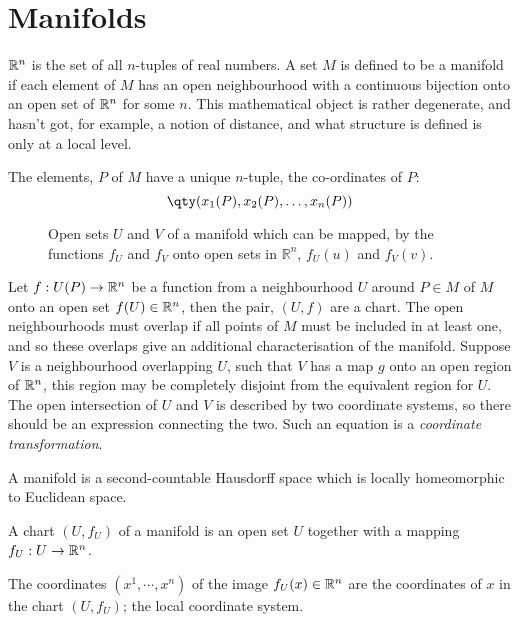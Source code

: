 
\section{Manifolds}
\label{sec:manifolds}

$\mathbb{R}^n$ is the set of all $n$-tuples of real numbers. A set $M$ is
defined to be a manifold if each element of $M$ has an open
neighbourhood with a continuous bijection onto an open set of $\mathbb{R}^n$
for some $n$. This mathematical object is rather degenerate, and
hasn't got, for example, a notion of distance, and what structure is
defined is only at a local level.

The elements, $P$ of $M$ have a unique $n$-tuple, the co-ordinates of
$P$:
\begin{equation}
  \label{eq:5}
  \qty( x_1(P), x_2(P), \dots, x_n(P) )
\end{equation}

\begin{figure}[b]
  \centering
  
  \caption{Open sets $U$ and $V$ of a manifold which can be mapped, by the functions $f_U$ and $f_V$ onto open sets in $\mathbb{R}^n$, $f_U(u)$ and $f_V(v)$.}
  \label{fig:manifolds}
\end{figure}

Let $f:U(P) \to \mathbb{R}^n$ be a function from a neighbourhood $U$ around
$P\in M$ of $M$ onto an open set $f(U) \in \mathbb{R}^n$, then the pair,
$(U,f)$ are a chart. The open neighbourhoods must overlap if all
points of $M$ must be included in at least one, and so these overlaps
give an additional characterisation of the manifold. Suppose $V$ is a
neighbourhood overlapping $U$, such that $V$ has a map $g$ onto an
open region of $\mathbb{R}^n$, this region may be completely disjoint from the
equivalent region for $U$. The open intersection of $U$ and $V$ is
described by two coordinate systems, so there should be an expression
connecting the two. Such an equation is a \emph{coordinate
  transformation}.

\begin{definition}[Manifold]
  A manifold is a second-countable Hausdorff space which is locally
  homeomorphic to Euclidean space.
\end{definition}
\begin{definition}[Chart]
  A chart $(U, f_U)$ of a manifold is an open set $U$ together with a
  mapping $f_U: U \to \mathbb{R}^n$.
\end{definition}
\begin{definition}[Coordinates]
  The coordinates $(x^1, \cdots, x^n)$ of the image $f_U(x) \in \mathbb{R}^n$
  are the coordinates of $x$ in the chart $(U, f_U)$; the local
  coordinate system.
\end{definition}

